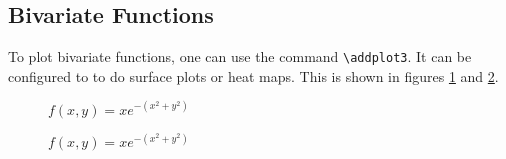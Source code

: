 \documentclass[12pt]{article}
\begin{document}


\subsection{Bivariate Functions}
To plot bivariate functions, one can use the command \verb|\addplot3|. It can be configured to to do surface plots or heat maps. This is shown in figures \ref{Fig:BivariateGaussian3D} and \ref{Fig:BivariateGaussianHeatMap}. 

\pgfplotsset{width=16cm,height=10cm,compat=1.9}

\begin{figure}[h]
\centering
\caption{$f(x,y) = x e^{-(x^2+y^2)}$}
\label{Fig:BivariateGaussian3D}
\end{figure}



\begin{figure}[h]
\centering
\caption{$f(x,y) = x e^{-(x^2+y^2)}$}
\label{Fig:BivariateGaussianHeatMap}
\end{figure}







\end{document}
